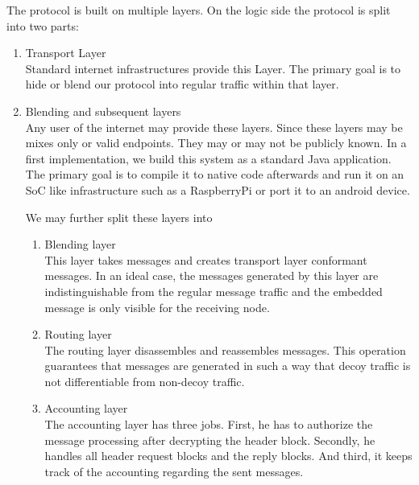The protocol is built on multiple layers. On the logic side the protocol is split into two parts:
\begin{enumerate}
	\item Transport Layer\\
          Standard internet infrastructures provide this Layer. The primary goal is to hide or blend our protocol into regular traffic within that layer.
	\item Blending and subsequent layers\\
	      Any user of the internet may provide these layers. Since these layers may be mixes only or valid endpoints. They may or may not be publicly known. In a first implementation, we build this system as a standard Java application. The primary goal is to compile it to native code afterwards and run it on an SoC like infrastructure such as a RaspberryPi or port it to an android device.
	      
	      We may further split these layers into
	      \begin{enumerate}
	      	\item Blending layer\\
                    This layer takes messages and creates transport layer conformant messages. In an ideal case, the messages generated by this layer are indistinguishable from the regular message traffic and the embedded message is only visible for the receiving node.
	      	\item Routing layer\\
                    The routing layer disassembles and reassembles messages. This operation guarantees that messages are generated in such a way that decoy traffic is not differentiable from non-decoy traffic.
	      	\item Accounting layer\\
                    The accounting layer has three jobs. First, he has to authorize the message processing after decrypting the header block. Secondly, he handles all header request blocks and the reply blocks. And third, it keeps track of the accounting regarding the sent messages.    
	      \end{enumerate}
\end{enumerate}


